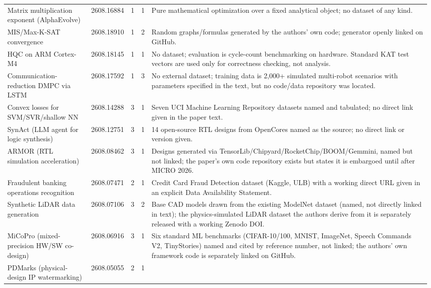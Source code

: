\documentclass[11pt]{article}
\begin{document}
\begin{longtable}{@{}p{4.3cm} p{1.3cm} c c p{5.3cm}@{}}
Matrix multiplication exponent (AlphaEvolve) & 2608.16884 & 1 & 1 &
Pure mathematical optimization over a fixed analytical object; no dataset of any
kind. \\
\addlinespace
MIS/Max-K-SAT convergence & 2608.18910 & 1 & 2 &
Random graphs/formulas generated by the authors' own code; generator openly linked on
GitHub. \\
\addlinespace
HQC on ARM Cortex-M4 & 2608.18145 & 1 & 1 &
No dataset; evaluation is cycle-count benchmarking on hardware. Standard KAT test
vectors are used only for correctness checking, not analysis. \\
\addlinespace
Communication-reduction DMPC via LSTM & 2608.17592 & 1 & 3 &
No external dataset; training data is 2{,}000+ simulated multi-robot scenarios with
parameters specified in the text, but no code/data repository was located. \\
\addlinespace
Convex losses for SVM/SVR/shallow NN & 2608.14288 & 3 & 1 &
Seven UCI Machine Learning Repository datasets named and tabulated; no direct link
given in the paper text. \\
\addlinespace
SynAct (LLM agent for logic synthesis) & 2608.12751 & 3 & 1 &
14 open-source RTL designs from OpenCores named as the source; no direct link or
version given. \\
\addlinespace
ARMOR (RTL simulation acceleration) & 2608.08462 & 3 & 1 &
Designs generated via TensorLib/Chipyard/RocketChip/BOOM/Gemmini, named but not
linked; the paper's own code repository exists but states it is embargoed until after
MICRO 2026. \\
\addlinespace
Fraudulent banking operations recognition & 2608.07471 & 2 & 1 &
Credit Card Fraud Detection dataset (Kaggle, ULB) with a working direct URL given in
an explicit Data Availability Statement. \\
\addlinespace
Synthetic LiDAR data generation & 2608.07106 & 3 & 2 &
Base CAD models drawn from the existing ModelNet dataset (named, not directly linked
in text); the physics-simulated LiDAR dataset the authors derive from it is
separately released with a working Zenodo DOI. \\
\addlinespace
MiCoPro (mixed-precision HW/SW co-design) & 2608.06916 & 3 & 1 &
Six standard ML benchmarks (CIFAR-10/100, MNIST, ImageNet, Speech Commands V2,
TinyStories) named and cited by reference number, not linked; the authors' own
framework code is separately linked on GitHub. \\
\addlinespace
PDMarks (physical-design IP watermarking) & 2608.05055 & 2 & 1 &

\end{longtable}
\end{document}
